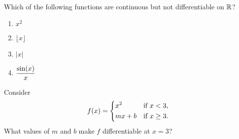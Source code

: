 \documentclass[10pt,t,presentation,ignorenonframetext,aspectratio=169]{beamer}
\begin{document}
\begin{frame}
  \vs
  \question{}
  Which of the following functions are continuous but not
  differentiable on $\mathbb{R}$?
  \begin{multicols}{2}
    \begin{enumerate}
    \item {$x^2$}
    \item {$\lfloor x \rfloor$}
    \item {$|x|$}
    \item {$\displaystyle \frac{\sin(x)}{x}$}
    \end{enumerate}
  \end{multicols}
\end{frame}

\begin{frame}
  \vs
  \begin{question}
    Consider
    \[
      f(x) = \begin{dcases}
        x^2 &\text{if $x<3$,}\\
        mx+b &\text{if $x\ge 3$.}
      \end{dcases}
    \]
    What values of $m$ and $b$ make $f$ differentiable at $x=3$?
  \end{question}
\end{frame}
\end{document}
